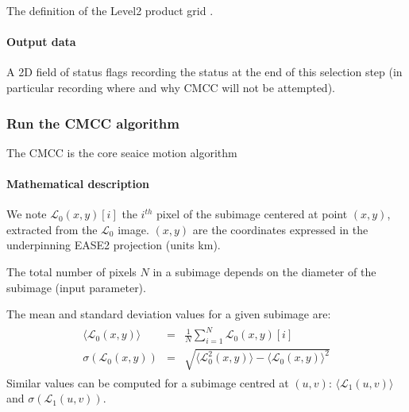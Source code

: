 \documentclass[letterpaper,10pt,english]{jupyterBook}
\begin{document}
\sphinxAtStartPar
The definition of the Level\sphinxhyphen{}2 product grid .


\paragraph{Output data}
\label{\detokenize{baseline_algorithm_definition:id11}}
\sphinxAtStartPar
A 2D field of status flags recording the status at the end of this selection step (in particular recording where and why CMCC will not be attempted).


\subsubsection{Run the CMCC algorithm}
\label{\detokenize{baseline_algorithm_definition:run-the-cmcc-algorithm}}
\sphinxAtStartPar
The CMCC is the core sea\sphinxhyphen{}ice motion algorithm


\paragraph{Mathematical description}
\label{\detokenize{baseline_algorithm_definition:id12}}
\sphinxAtStartPar
We note \(\mathcal{L}_0(x,y)[i]\) the \(i^{th}\) pixel of the 
sub\sphinxhyphen{}image centered at point \((x,y)\), extracted from the \(\mathcal{L}_0\)
image. \((x,y)\) are the coordinates expressed in the underpinning EASE2
projection (units km).

\sphinxAtStartPar
The total number of pixels \(N\) in a sub\sphinxhyphen{}image depends on the diameter of the sub\sphinxhyphen{}image (input parameter).

\sphinxAtStartPar
The mean and standard deviation values for a given sub\sphinxhyphen{}image are:
\begin{equation*}
\begin{split}
\begin{aligned}
\langle \mathcal{L}_0(x,y) \rangle & = & \frac{1}{N} \sum_{i=1}^{N} \mathcal{L}_0(x,y)[i] \nonumber \\
\sigma ( \mathcal{L}_0(x,y) ) & = & \sqrt{\langle \mathcal{L}^2_0(x,y) \rangle - \langle \mathcal{L}_0(x,y) \rangle^2}  \nonumber
\end{aligned}
\end{split}
\end{equation*}
\sphinxAtStartPar
Similar values can be computed for a  sub\sphinxhyphen{}image centred at
\((u,v)\): \(\langle \mathcal{L}_1(u,v) \rangle\) and
\(\sigma ( \mathcal{L}_1(u,v) )\).
\end{document}
